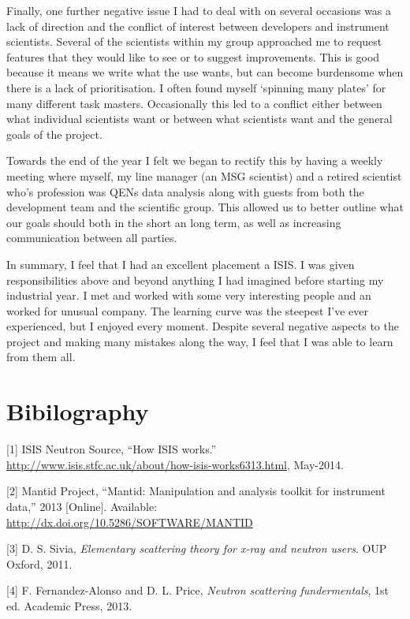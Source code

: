 \documentclass[paper=a4, fontsize=11pt]{scrartcl}	%
\numberwithin{equation}{section}															%
\numberwithin{figure}{section}																%
\numberwithin{table}{section}
\begin{document}
Finally, one further negative issue I had to deal with on several
occasions was a lack of direction and the conflict of interest between
developers and instrument scientists. Several of the scientists within
my group approached me to request features that they would like to see
or to suggest improvements. This is good because it means we write what
the use wants, but can become burdensome when there is a lack of
prioritisation. I often found myself `spinning many plates' for many
different task masters. Occasionally this led to a conflict either
between what individual scientists want or between what scientists want
and the general goals of the project.

Towards the end of the year I felt we began to rectify this by having a
weekly meeting where myself, my line manager (an MSG scientist) and a
retired scientist who's profession was QENs data analysis along with
guests from both the development team and the scientific group. This
allowed us to better outline what our goals should both in the short an
long term, as well as increasing communication between all parties.

In summary, I feel that I had an excellent placement a ISIS. I was given
responsibilities above and beyond anything I had imagined before
starting my industrial year. I met and worked with some very interesting
people and an worked for unusual company. The learning curve was the
steepest I've ever experienced, but I enjoyed every moment. Despite
several negative aspects to the project and making many mistakes along
the way, I feel that I was able to learn from them all.

\section*{Bibilography}\label{bibilography}

{[}1{]} ISIS Neutron Source, ``How ISIS works.''
\url{http://www.isis.stfc.ac.uk/about/how-isis-works6313.html},
May-2014.

{[}2{]} Mantid Project, ``Mantid: Manipulation and analysis toolkit for
instrument data,'' 2013 {[}Online{]}. Available:
\url{http://dx.doi.org/10.5286/SOFTWARE/MANTID}

{[}3{]} D. S. Sivia, \emph{Elementary scattering theory for x-ray and
neutron users}. OUP Oxford, 2011.

{[}4{]} F. Fernandez-Alonso and D. L. Price, \emph{Neutron scattering
fundermentals}, 1st ed. Academic Press, 2013.
\end{document}
